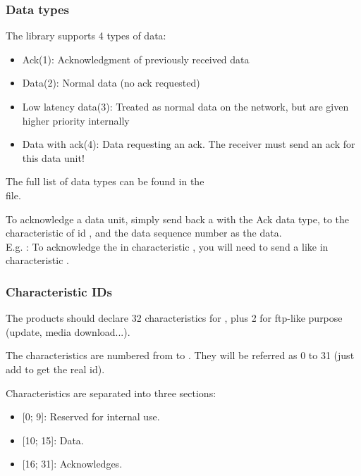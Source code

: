 \subsubsection{Data types}

The  library supports 4 types of data:
\begin{itemize}
\item{Ack(1): Acknowledgment of previously received data} 
\item{Data(2): Normal data (no ack requested)}
\item{Low latency data(3): Treated as normal data on the network, but are given higher priority internally}
\item{Data with ack(4): Data requesting an ack. The receiver must send an ack for this data unit!}
\end{itemize}

The full list of data types can be found in the\\
 file.


To acknowledge a data unit, simply send back a  with the Ack data type, to the characteristic of id , and the data sequence number as the data.\\
E.g. : To acknowledge the   in characteristic , you will need to send a  like  in characteristic .

\subsubsection{Characteristic IDs}


The products should declare 32 characteristics for , plus 2 for ftp-like purpose (update, media download...).


The  characteristics are numbered from  to . They will be referred as 0 to 31 (just add  to get the real id).


Characteristics are separated into three sections:
\begin{itemize}
\item{[0; 9]: Reserved for  internal use.}
\item{[10; 15]: Data.}
\item{[16; 31]: Acknowledges.}
\end{itemize}

